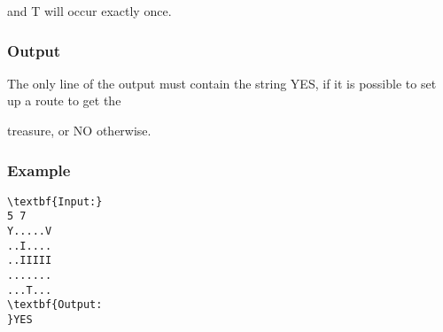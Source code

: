 and T will occur exactly once.

\subsubsection{Output}

The only line of the output must contain the string YES, if it is possible to set up a route to get the

treasure, or NO otherwise.

\subsubsection{Example}
\begin{verbatim}
\textbf{Input:}
5 7
Y.....V
..I....
..IIIII
.......
...T...
\textbf{Output:
}YES\end{verbatim}
